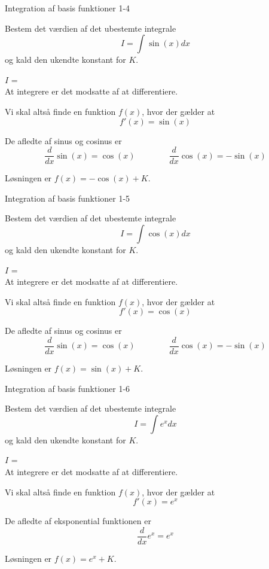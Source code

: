 \documentclass{article}
\begin{document}
\begin{exercise}{Integration af basis funktioner 1-4}

Bestem det værdien af det ubestemte integrale
\[
I = \int \sin(x) dx
\]
og kald den ukendte konstant for $K$.

$I$ =  \\

\hint
At integrere er det modsatte af at differentiere.

\hint
Vi skal altså finde en funktion $f(x)$, hvor der gælder at
\[
f'(x) = \sin(x)
\]

\hint
De afledte af sinus og cosinus er
\[
\frac{d}{dx} \sin(x) = \cos(x)
\qquad \qquad 
\frac{d}{dx} \cos(x) = -\sin(x)
\]


\hint
Løsningen er $f(x) = -\cos(x) + K$.

\end{exercise}


\begin{exercise}{Integration af basis funktioner 1-5}

Bestem det værdien af det ubestemte integrale
\[
I = \int \cos(x) dx
\]
og kald den ukendte konstant for $K$.

$I$ =  \\

\hint
At integrere er det modsatte af at differentiere.

\hint
Vi skal altså finde en funktion $f(x)$, hvor der gælder at
\[
f'(x) = \cos(x)
\]

\hint
De afledte af sinus og cosinus er
\[
\frac{d}{dx} \sin(x) = \cos(x)
\qquad \qquad 
\frac{d}{dx} \cos(x) = -\sin(x)
\]


\hint
Løsningen er $f(x) = \sin(x) + K$.

\end{exercise}


\begin{exercise}{Integration af basis funktioner 1-6}

Bestem det værdien af det ubestemte integrale
\[
I = \int e^x dx
\]
og kald den ukendte konstant for $K$.

$I$ =  \\

\hint
At integrere er det modsatte af at differentiere.

\hint
Vi skal altså finde en funktion $f(x)$, hvor der gælder at
\[
f'(x) = e^x
\]

\hint
De afledte af eksponential funktionen er 
\[
\frac{d}{dx} e^x = e^x
\]


\hint
Løsningen er $f(x) = e^x + K$.

\end{exercise}
\end{document}
